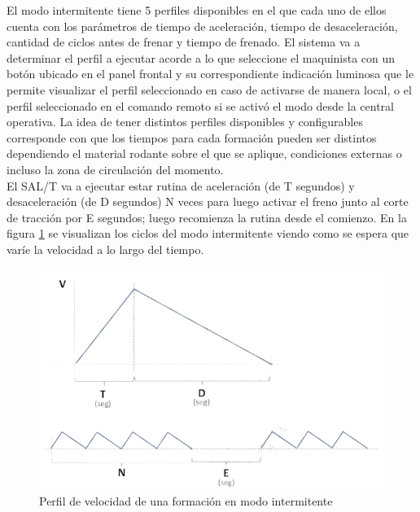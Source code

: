 El modo intermitente tiene 5 perfiles disponibles en el que cada uno de ellos cuenta con los parámetros de tiempo de aceleración, tiempo de desaceleración, cantidad de ciclos antes de frenar y tiempo de frenado. El sistema va a determinar el perfil a ejecutar acorde a lo que seleccione el maquinista con un botón ubicado en el panel frontal y su correspondiente indicación luminosa que le permite visualizar el perfil seleccionado en caso de activarse de manera local, o el perfil seleccionado en el comando remoto si se activó el modo desde la central operativa. La idea de tener distintos perfiles disponibles y configurables corresponde con que los tiempos para cada formación pueden ser distintos dependiendo el material rodante sobre el que se aplique, condiciones externas o incluso la zona de circulación del momento.\\

El SAL/T va a ejecutar estar rutina de aceleración (de T segundos) y desaceleración (de D segundos) N veces para luego activar el freno junto al corte de tracción por E segundos; luego recomienza la rutina desde el comienzo. En la figura \ref{fig:intermitente} se visualizan los ciclos del modo intermitente viendo como se espera que varíe la velocidad a lo largo del tiempo. 

\begin{figure}[H]
    \centering
    \includegraphics[width = \linewidth]{img/intermitente.png}    
    \caption{Perfil de velocidad de una formación en modo intermitente}
    \label{fig:intermitente}
\end{figure}    
